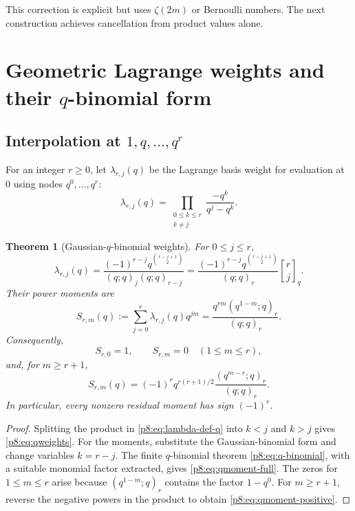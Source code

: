 \documentclass[11pt]{article}
\numberwithin{equation}{section}
\newtheorem{theorem}{Theorem}[section]
\theoremstyle{definition}
\theoremstyle{remark}
\newcommand{\qbinom}[3]{\genfrac{[}{]}{0pt}{}{#1}{#2}_{#3}}
\begin{document}
This correction is explicit but uses $\zeta(2m)$ or Bernoulli numbers. The next construction achieves cancellation from product values alone.

\section{Geometric Lagrange weights and their \texorpdfstring{$q$}{q}-binomial form}
\label{p8:sec:qweights}

\subsection{Interpolation at \texorpdfstring{$1,q,\ldots,q^r$}{1, q, ..., q-to-the-r}}

For an integer $r\ge0$, let $\lambda_{r,j}(q)$ be the Lagrange basis weight for evaluation at $0$ using nodes $q^0,\ldots,q^r$:
\begin{equation}
\lambda_{r,j}(q)=\prod_{\substack{0\le k\le r\\k\ne j}}
\frac{-q^k}{q^j-q^k}.
\label{p8:eq:lambda-def-q}
\end{equation}

\begin{theorem}[Gaussian-$q$-binomial weights]
\label{p8:thm:qweights}
For $0\le j\le r$,
\begin{equation}
\boxed{
\lambda_{r,j}(q)
=\frac{(-1)^{r-j}q^{\binom{r-j+1}{2}}}
{(q;q)_j(q;q)_{r-j}}
=\frac{(-1)^{r-j}q^{\binom{r-j+1}{2}}}{(q;q)_r}
\qbinom{r}{j}{q}.}
\label{p8:eq:qweights}
\end{equation}
Their power moments are
\begin{equation}
S_{r,m}(q):=\sum_{j=0}^{r}\lambda_{r,j}(q)q^{jm}
=\frac{q^{rm}(q^{1-m};q)_r}{(q;q)_r}.
\label{p8:eq:qmoment-full}
\end{equation}
Consequently,
\begin{equation}
S_{r,0}=1,
\qquad S_{r,m}=0\quad(1\le m\le r),
\label{p8:eq:qmoment-cancel}
\end{equation}
and, for $m\ge r+1$,
\begin{equation}
S_{r,m}(q)
=(-1)^r q^{r(r+1)/2}
\frac{(q^{m-r};q)_r}{(q;q)_r}.
\label{p8:eq:qmoment-positive}
\end{equation}
In particular, every nonzero residual moment has sign $(-1)^r$.
\end{theorem}

\begin{proof}
Splitting the product in \cref{p8:eq:lambda-def-q} into $k<j$ and $k>j$ gives \cref{p8:eq:qweights}. For the moments, substitute the Gaussian-binomial form and change variables $k=r-j$. The finite $q$-binomial theorem \cref{p8:eq:q-binomial}, with a suitable monomial factor extracted, gives \cref{p8:eq:qmoment-full}. The zeros for $1\le m\le r$ arise because $(q^{1-m};q)_r$ contains the factor $1-q^0$. For $m\ge r+1$, reverse the negative powers in the product to obtain \cref{p8:eq:qmoment-positive}.
\end{proof}
\end{document}
